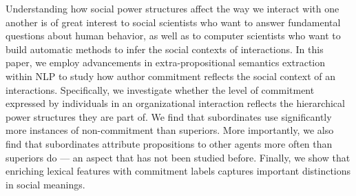 Understanding how social power structures affect the way we interact with one another is of great interest to social scientists who want to answer fundamental questions about human behavior, as well as to computer scientists who want to build automatic methods to infer the social contexts of interactions. In this paper, we employ advancements in extra-propositional semantics extraction within NLP to study how author commitment reflects the social context of an interactions. Specifically, we investigate whether the level of commitment expressed by individuals in an organizational interaction reflects the hierarchical power structures they are part of. We find that subordinates use significantly more instances of non-commitment than superiors. More importantly, we also find that subordinates attribute propositions to other agents more often than superiors do --- an aspect that has not been studied before. Finally, we show that enriching lexical features with commitment labels captures important distinctions in social meanings.
